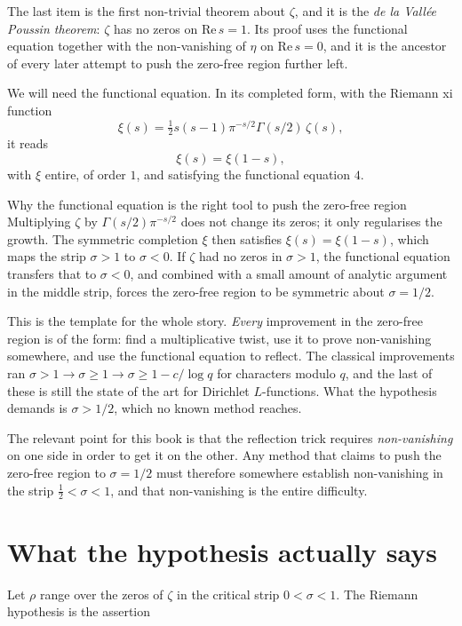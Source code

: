 The last item is the first non-trivial theorem about $\zeta$, and it is the
\emph{de la Vallée Poussin theorem}: $\zeta$ has no zeros on $\mathrm{Re}\,  s = 1$. Its
proof uses the functional equation together with the non-vanishing of
$\eta$ on $\mathrm{Re}\,  s = 0$, and it is the ancestor of every later attempt to push
the zero-free region further left.

We will need the functional equation. In its completed form, with the Riemann
xi function
\begin{equation}
\xi(s) = \tfrac12 s(s-1)\pi^{-s/2}\Gamma(s/2)\,\zeta(s),
\label{eq:xi}
\end{equation}
it reads
\begin{equation}
\xi(s) = \xi(1-s),
\label{eq:func-eq}
\end{equation}
with $\xi$ entire, of order $1$, and satisfying the functional equation
$4$.

\begin{deeper}{Why the functional equation is the right tool to push the
zero-free region}
Multiplying $\zeta$ by $\Gamma(s/2)\pi^{-s/2}$ does not change its zeros; it
only regularises the growth. The symmetric completion $\xi$ then satisfies
$\xi(s) = \xi(1-s)$, which maps the strip $\sigma > 1$ to $\sigma < 0$. If
$\zeta$ had no zeros in $\sigma > 1$, the functional equation transfers that to
$\sigma < 0$, and combined with a small amount of analytic argument in the
middle strip, forces the zero-free region to be symmetric about $\sigma = 1/2$.

This is the template for the whole story. \emph{Every} improvement in the
zero-free region is of the form: find a multiplicative twist, use it to prove
non-vanishing somewhere, and use the functional equation to reflect. The
classical improvements ran $\sigma > 1 \to \sigma \ge 1 \to
\sigma \ge 1 - c/\log q$ for characters modulo $q$, and the last of these is
still the state of the art for Dirichlet $L$-functions. What the hypothesis
demands is $\sigma > 1/2$, which no known method reaches.

The relevant point for this book is that the reflection trick requires
\emph{non-vanishing} on one side in order to get it on the other. Any method
that claims to push the zero-free region to $\sigma = 1/2$ must therefore
somewhere establish non-vanishing in the strip $\tfrac12 < \sigma < 1$, and
that non-vanishing is the entire difficulty.
\end{deeper}

\section{What the hypothesis actually says}Let $\rho$ range over the zeros of $\zeta$ in the critical strip
$0 < \sigma < 1$. The Riemann hypothesis is the assertion

